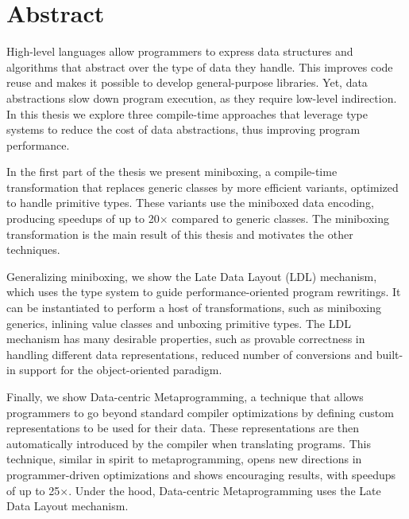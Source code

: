 \begingroup
\let\cleardoublepage\clearpage

\cleardoublepage
\chapter*{Abstract}

\vspace{0.7em}

High-level languages allow programmers to express data structures and algorithms that abstract over the type of data they handle. This improves code reuse and makes it possible to develop general-purpose libraries. Yet, data abstractions slow down program execution, as they require low-level indirection. In this thesis we explore three compile-time approaches that leverage type systems to reduce the cost of data abstractions, thus improving program performance.

\vspace{0.7em}

In the first part of the thesis we present miniboxing, a compile-time transformation that replaces generic classes by more efficient variants, optimized to handle primitive types. These variants use the miniboxed data encoding, producing speedups of up to 20$\times$ compared to generic classes. The miniboxing transformation is the main result of this thesis and motivates the other techniques.

\vspace{0.7em}

Generalizing miniboxing, we show the Late Data Layout (LDL) mechanism, which uses the type system to guide performance-oriented program rewritings. It can be instantiated to perform a host of transformations, such as miniboxing generics, inlining value classes and unboxing primitive types. The LDL mechanism has many desirable properties, such as provable correctness in handling different data representations, reduced number of conversions and built-in support for the object-oriented paradigm.

\vspace{0.7em}

Finally, we show Data-centric Metaprogramming, a technique that allows programmers to go beyond standard compiler optimizations by defining custom representations to be used for their data. These representations are then automatically introduced by the compiler when translating programs. This technique, similar in spirit to metaprogramming, opens new directions in programmer-driven optimizations and shows encouraging results, with speedups of up to 25$\times$. Under the hood, Data-centric Metaprogramming uses the Late Data Layout mechanism.


